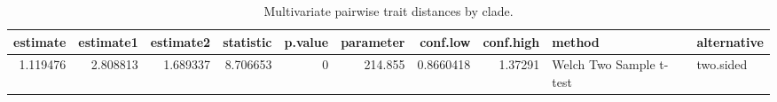 \begin{table}

\caption{\label{tab:}Multivariate pairwise trait distances by clade.}
\centering
\fontsize{8}{10}\selectfont
\begin{tabular}[t]{rrrrrrrrll}
\toprule
estimate & estimate1 & estimate2 & statistic & p.value & parameter & conf.low & conf.high & method & alternative\\
\midrule
1.119476 & 2.808813 & 1.689337 & 8.706653 & 0 & 214.855 & 0.8660418 & 1.37291 & Welch Two Sample t-test & two.sided\\
\bottomrule
\end{tabular}
\end{table}